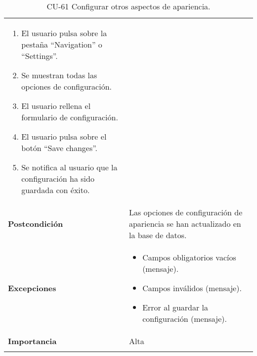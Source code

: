 \begin{longtable}[]{@{}ll@{}}
\begin{minipage}[t]{0.72\columnwidth}
\begin{enumerate}
\def\labelenumi{\arabic{enumi}.}
\tightlist
\item
  El usuario pulsa sobre la pestaña ``Navigation'' o ``Settings''.
\item
  Se muestran todas las opciones de configuración.
\item
  El usuario rellena el formulario de configuración.
\item
  El usuario pulsa sobre el botón ``Save changes''.
\item
  Se notifica al usuario que la configuración ha sido guardada con
  éxito.
\end{enumerate}\strut
\end{minipage}\tabularnewline
\begin{minipage}[t]{0.22\columnwidth}\raggedright
\textbf{Postcondición}\strut
\end{minipage} & \begin{minipage}[t]{0.72\columnwidth}\raggedright
Las opciones de configuración de apariencia se han actualizado en la
base de datos.\strut
\end{minipage}\tabularnewline
\begin{minipage}[t]{0.22\columnwidth}\raggedright
\textbf{Excepciones}\strut
\end{minipage} & \begin{minipage}[t]{0.72\columnwidth}\raggedright
\begin{itemize}
\tightlist
\item
  Campos obligatorios vacíos (mensaje).
\item
  Campos inválidos (mensaje).
\item
  Error al guardar la configuración (mensaje).
\end{itemize}\strut
\end{minipage}\tabularnewline
\begin{minipage}[t]{0.22\columnwidth}\raggedright
\textbf{Importancia}\strut
\end{minipage} & \begin{minipage}[t]{0.72\columnwidth}\raggedright
Alta\strut
\end{minipage}\tabularnewline
\bottomrule
\caption{CU-61 Configurar otros aspectos de apariencia.}
\end{longtable}

